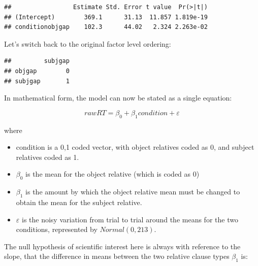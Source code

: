 \documentclass[12pt,]{krantz}
\newenvironment{Shaded}{\begin{snugshade}}{\end{snugshade}}
\newcommand{\DataTypeTok}[1]{\textcolor[rgb]{0.13,0.29,0.53}{#1}}
\newcommand{\KeywordTok}[1]{\textcolor[rgb]{0.13,0.29,0.53}{\textbf{#1}}}
\newcommand{\NormalTok}[1]{#1}
\newcommand{\OperatorTok}[1]{\textcolor[rgb]{0.81,0.36,0.00}{\textbf{#1}}}
\newcommand{\StringTok}[1]{\textcolor[rgb]{0.31,0.60,0.02}{#1}}
\providecommand{\tightlist}{%
  \setlength{\itemsep}{0pt}\setlength{\parskip}{0pt}}
\begin{document}
\begin{verbatim}
##                 Estimate Std. Error t value  Pr(>|t|)
## (Intercept)        369.1      31.13  11.857 1.819e-19
## conditionobjgap    102.3      44.02   2.324 2.263e-02
\end{verbatim}

Let's switch back to the original factor level ordering:

\begin{Shaded}
\end{Shaded}

\begin{verbatim}
##         subjgap
## objgap        0
## subjgap       1
\end{verbatim}

In mathematical form, the model can now be stated as a single equation:

\begin{equation}
rawRT = \beta_0 + \beta_1 condition + \varepsilon
\end{equation}

where

\begin{itemize}
\tightlist
\item
  condition is a 0,1 coded vector, with object relatives coded as 0, and subject relatives coded as 1.
\item
  \(\beta_0\) is the mean for the object relative (which is coded as 0)
\item
  \(\beta_1\) is the amount by which the object relative mean must be
  changed to obtain the mean for the subject relative.
\item
  \(\varepsilon\) is the noisy variation from trial to trial around the means for the two conditions, represented by \(Normal(0,213)\).
\end{itemize}

The null hypothesis of scientific interest here is always with reference to the slope, that the difference in means between the two relative clause types \(\beta_1\) is:
\end{document}
